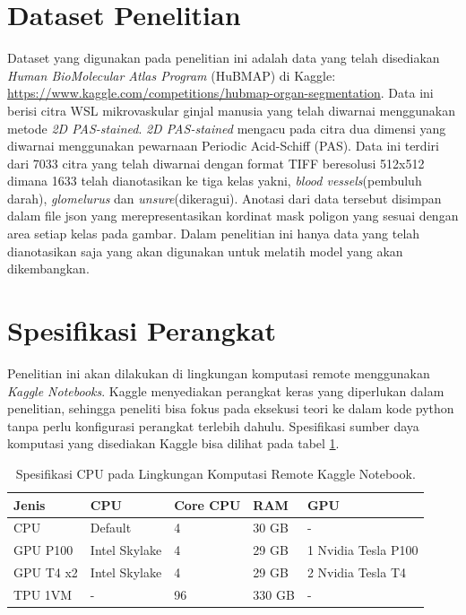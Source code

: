 \section{Dataset Penelitian}

\noindent Dataset yang digunakan pada penelitian ini adalah data yang telah disediakan \textit{Human BioMolecular Atlas Program }(HuBMAP) di Kaggle: \url{https://www.kaggle.com/competitions/hubmap-organ-segmentation}\cite{howard_hubmap_2023}.  Data ini berisi citra WSL mikrovaskular ginjal manusia yang telah diwarnai menggunakan metode \textit{2D PAS-stained}. \textit{2D PAS-stained} mengacu pada citra dua dimensi yang diwarnai menggunakan pewarnaan Periodic Acid-Schiff (PAS). Data ini terdiri dari 7033 citra yang telah diwarnai dengan format TIFF beresolusi 512x512 dimana 1633 telah dianotasikan ke tiga kelas yakni, \textit{blood vessels}(pembuluh darah), \textit{glomelurus} dan \textit{unsure}(dikeragui).  Anotasi dari data tersebut disimpan dalam file json yang merepresentasikan kordinat mask poligon yang sesuai dengan area setiap kelas pada gambar. Dalam penelitian ini hanya data yang telah dianotasikan saja yang akan digunakan untuk melatih model yang akan dikembangkan.



\section{Spesifikasi Perangkat}

\noindent Penelitian ini akan dilakukan di lingkungan komputasi remote menggunakan \textit{Kaggle Notebooks}. Kaggle menyediakan perangkat keras yang diperlukan dalam penelitian, sehingga peneliti bisa fokus pada eksekusi teori ke dalam kode python tanpa perlu konfigurasi perangkat terlebih dahulu. Spesifikasi sumber daya komputasi yang disediakan Kaggle bisa dilihat pada tabel \ref{tab:cpu_specs}.
\begin{table}[h]
	\centering
	\caption{Spesifikasi CPU pada Lingkungan Komputasi Remote Kaggle Notebook.} %
	\label{tab:cpu_specs}
	\begin{tabular}{lllll}
		\hline
		\textbf{Jenis} & \textbf{CPU}                             & \textbf{Core CPU} & \textbf{RAM} & \textbf{GPU}        \\ \hline
		CPU            & Default & 4                 & 30 GB        & -                   \\ \hline
		GPU P100       & Intel Skylake                            & 4                 & 29 GB        & 1 Nvidia Tesla P100 \\ \hline
		GPU T4 x2      & Intel Skylake                            & 4                 & 29 GB        & 2 Nvidia Tesla T4   \\ \hline
		TPU 1VM        & -                                        & 96                & 330 GB       & -                   \\ \hline
	\end{tabular}
\end{table}

